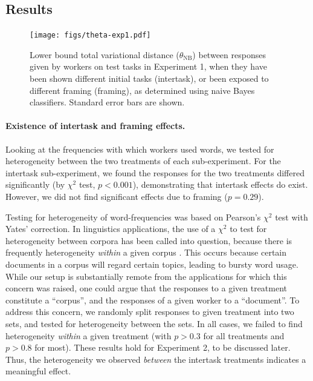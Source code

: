 \documentclass{sigchi}
\begin{document}
\subsection{Results}

\begin{figure}[t]
    \centering
	\texttt{[image: figs/theta-exp1.pdf]}
	\caption{
	    Lower bound total variational distance ($\theta_\mathrm{NB}$) 
		between responses given
		by workers on test tasks in Experiment 1, when they have been 
		shown different initial tasks (intertask), or been exposed to
		different framing (framing), as determined using naive Bayes 
		classifiers.  Standard error bars are shown.
	}
	\label{fig:theta-exp1}
\end{figure}

\paragraph{Existence of intertask and framing effects.} 
Looking at the frequencies with which workers used words, we tested for
heterogeneity between the two treatments of each sub-experiment.
For the intertask sub-experiment, we found the responses 
for the two treatments differed significantly 
(by $\chi^2$ test, $p<0.001$), 
demonstrating that intertask effects do exist.  However, we did not find 
significant effects due to framing ($p=0.29$).

Testing for heterogeneity of word-frequencies was based on 
Pearson's $\chi^2$ test with Yates' correction.
In linguistics applications, the use of a $\chi^2$ to test for 
heterogeneity between corpora has been called
into question, because there is frequently heterogeneity \textit{within}
a given corpus \cite{kilgarriff1996comparing}.
This occurs because certain documents in a corpus will regard certain 
topics, leading to bursty word usage.  While our setup is substantially
remote from the applications for which this concern was raised, 
one could argue that the responses to a given treatment
constitute a ``corpus'', and the responses of a given worker to a 
``document''.
To address this concern, we randomly split responses to given treatment
into two sets, and tested for heterogeneity between the sets.
In all cases, we failed to find heterogeneity \textit{within} a given 
treatment (with $p > 0.3$ for all treatments and $p > 0.8$ for most).
These results hold for Experiment 2, to be discussed later.
Thus, the heterogeneity we observed \textit{between} the intertask 
treatments indicates a meaningful effect.
\end{document}
